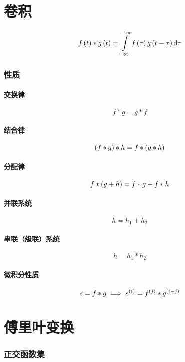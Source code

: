 \documentclass{article}
\begin{document}
\part{卷积}

\[\ft\ast g\pare{t}
    =\impint
    f\pare{\tau}g\pare{t-\tau}\d\tau\]

\section{性质\label{连续卷积性质}}

\subsection{交换律}

\[f\ast g=g\ast f\]

\subsection{结合律}

\[\left(f\ast g\right)\ast h=f\ast\left(g\ast h\right)\]

\subsection{分配律}

\[f\ast\left(g+h\right)=f\ast g+f\ast h\]

\subsection{并联系统}

\[h=h_1+h_2\]

\subsection{串联（级联）系统}

\[h=h_1\ast h_2\]

\subsection{微积分性质}

\[s=f\ast g\implies s^{\left(i\right)}=f^{\left(j\right)}\ast g^{\left(i-j\right)}\]

\part{傅里叶变换}

\section{正交函数集}
\end{document}
